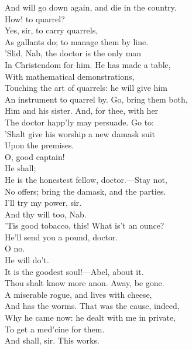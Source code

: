 \documentclass[a4paper,oneside]{memoir}
\begin{document}
\begin{drama*}
And will go down again, and die in the country.\\
\facespeaks How! to quarrel?\\
\druggerspeaks {} Yes, sir, to carry quarrels,\\
As gallants do; to manage them by line.\\
\facespeaks 'Slid, Nab, the doctor is the only man\\
In Christendom for him. He has made a table,\\
With mathematical demonstrations,\\
Touching the art of quarrels: he will give him\\
An instrument to quarrel by. Go, bring them both,\\
Him and his sister. And, for thee, with her\\
The doctor happ'ly may persuade. Go to:\\
'Shalt give his worship a new damask suit\\
Upon the premises.\\
\subtlespeaks {} O, good captain!\\
\facespeaks He shall;\\
He is the honestest fellow, doctor.---Stay not,\\
No offers; bring the damask, and the parties.\\
\druggerspeaks I'll try my power, sir.\\
\facespeaks {} And thy will too, Nab.\\
\subtlespeaks 'Tis good tobacco, this! What is't an ounce?\\
\facespeaks He'll send you a pound, doctor.\\
\subtlespeaks {} O no.\\
\facespeaks {} He will do't.\\
It is the goodest soul!---Abel, about it.\\
Thou shalt know more anon. Away, be gone.\\
A miserable rogue, and lives with cheese,\\
And has the worms. That was the cause, indeed,\\
Why he came now: he dealt with me in private,\\
To get a med'cine for them.\\
\subtlespeaks {} And shall, sir. This works.\\

\end{drama*}
\end{document}
